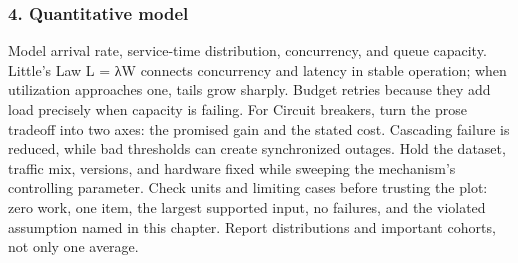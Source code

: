 \subsubsection*{4. Quantitative model}
Model arrival rate, service-time distribution, concurrency, and queue capacity. Little's Law L = λW connects concurrency and latency in stable operation; when utilization approaches one, tails grow sharply. Budget retries because they add load precisely when capacity is failing.
For Circuit breakers, turn the prose tradeoff into two axes: the promised gain and the stated cost. Cascading failure is reduced, while bad thresholds can create synchronized outages. Hold the dataset, traffic mix, versions, and hardware fixed while sweeping the mechanism's controlling parameter.
Check units and limiting cases before trusting the plot: zero work, one item, the largest supported input, no failures, and the violated assumption named in this chapter. Report distributions and important cohorts, not only one average.
